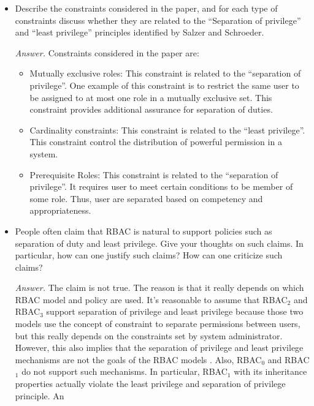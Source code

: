 \documentclass[11pt]{article}
\begin{document}
\begin{description}
{\begin{itemize}
\begin{mdframed}
	\\
	RBAC$_3$: is the consolidated model that combined both RBAC$_1$ and RBAC$_2$ to provide both hierarchies and constraints.  
\end{mdframed}
 \item
Describe the constraints considered in the paper, and for each type of constraints discuss whether they are related to the ``Separation of privilege'' and ``least privilege'' principles identified by Salzer and Schroeder.
\begin{mdframed}
	\textit{Answer. } Constraints considered in the paper are: 
	\begin{itemize}
		\item Mutually exclusive roles: This constraint is related to the ``separation of privilege''. One example of this constraint is to restrict the same user to be assigned to at most one role in a mutually exclusive set. This constraint provides additional assurance for separation of duties.
		\item Cardinality constraints: This constraint is related to the ``least privilege''. This constraint control the distribution of powerful permission in a system. 
		\item Prerequisite Roles: This constraint is related to the ``separation of privilege''. It requires user to meet certain conditions to be member of some role. Thus, user are separated based on competency and appropriateness.  
	\end{itemize}
\end{mdframed}
 \item
People often claim that RBAC is natural to support policies such as separation of duty and least privilege.  Give your thoughts on such claims.  In particular, how can
one justify such claims?  How can one criticize such claims? 
\begin{mdframed}
	\textit{Answer. } The claim is not true. The reason is that it really depends on which RBAC model and policy are used. It's reasonable to assume that RBAC$_2$ and RBAC$_3$ support separation of privilege and least privilege because those two models use the concept of constraint to separate permissions between users, but this really depends on the constraints set by system administrator. However, this also implies that the separation of privilege and least privilege mechanisms are not the goals of the RBAC models . Also, RBAC$_0$ and RBAC$_1$ do not support such mechanisms. In particular, RBAC$_1$ with its inheritance properties actually violate the least privilege and separation of privilege principle. An
\end{mdframed}
\end{itemize}
}


\end{description}
\end{document}
